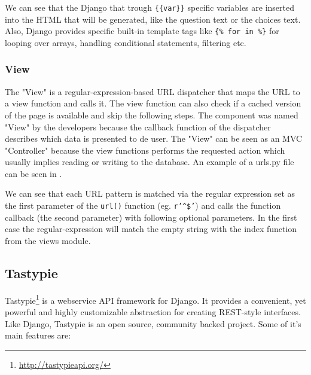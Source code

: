 

We can see that the Django that trough \texttt{\{\{var\}\}} specific variables are inserted into the HTML that will be generated, like the question text or the choices text. Also, Django provides specific built-in template tags like \texttt{\{\% for in \%\}} for looping over arrays, handling conditional statements, filtering etc.

\subsubsection{View}
\label{sub-sub-sec:view}

The "View" is a regular-expression-based URL dispatcher that maps the URL to a view function and calls it. The view function can also check if a cached version of the page is available and skip the following steps. The component was named "View" by the developers because the callback function of the dispatcher describes which data is presented to de user. The "View" can be seen as an MVC "Controller" because the view functions performs the requested action which usually implies reading or writing to the database. An example of a urls.py file can be seen in .



We can see that each URL pattern is matched via the regular expression set as the first parameter of the \texttt{url()} function (eg. \texttt{r'\^{}\$'}) and calls the function callback (the second parameter) with following optional parameters. In the first case the regular-expression will match the empty string with the index function from the views module.



\subsection{Tastypie}
\label{sub-sec:tastypie}

Tastypie\footnote{\url{http://tastypieapi.org/}} is a webservice API framework for Django. It provides a convenient, yet powerful and highly customizable abstraction for creating REST-style interfaces. Like Django, Tastypie is an open source, community backed project. Some of it's main features are:

